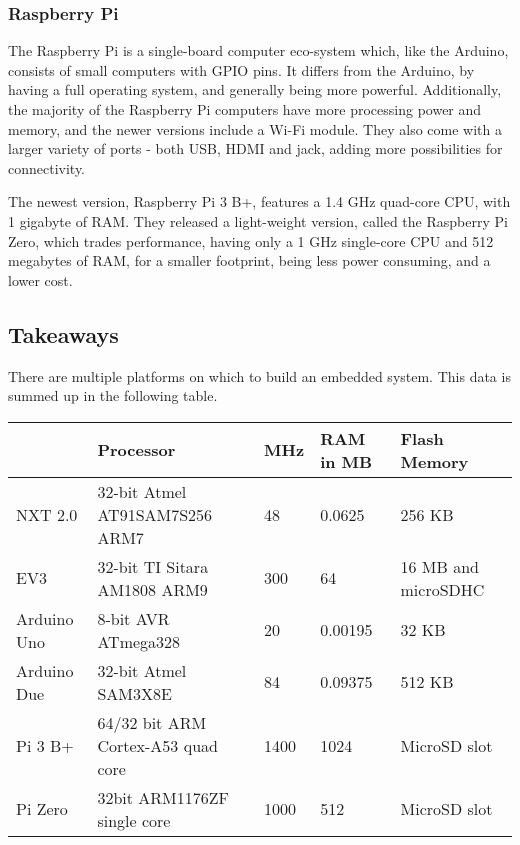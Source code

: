 \subsubsection{Raspberry Pi}
The Raspberry Pi is a single-board computer eco-system which, like the Arduino, consists of small computers with GPIO pins.
It differs from the Arduino, by having a full operating system, and generally being more powerful.
Additionally, the majority of the Raspberry Pi computers have more processing power and memory, and the newer versions include a Wi-Fi module.
They also come with a larger variety of ports - both USB, HDMI and jack, adding more possibilities for connectivity.


The newest version, Raspberry Pi 3 B+, features a 1.4 GHz quad-core CPU, with 1 gigabyte of RAM.
They released a light-weight version, called the Raspberry Pi Zero, which trades performance, having only a 1 GHz single-core CPU and 512 megabytes of RAM, for a smaller footprint, being less power consuming, and a lower cost.

\subsection{Takeaways}
There are multiple platforms on which to build an embedded system.
This data is summed up in the following table.

\begin{table}[h]
	\begin{adjustbox}{max width=\textwidth}
	\begin{tabular}{|l|l|l|l|l|}
		\hline
		                & Processor                          & MHz 	& RAM in MB    & Flash Memory          	\\\hline
		NXT 2.0 		& 32-bit Atmel AT91SAM7S256 ARM7     & 48  	& 0.0625   & 256 KB                   	\\
		EV3     		& 32-bit TI Sitara AM1808 ARM9       & 300 	& 64   & 16 MB and microSDHC 			\\
		Arduino Uno    	& 8-bit AVR ATmega328                & 20  	& 0.00195    & 32 KB                    \\
		Arduino Due    	& 32-bit Atmel SAM3X8E               & 84  	& 0.09375   & 512 KB                   	\\
		Pi 3 B+      	& 64/32 bit ARM Cortex-A53 quad core & 1400 & 1024    & MicroSD slot            	\\
		Pi Zero       	& 32bit ARM1176ZF single core        & 1000 & 512  & MicroSD slot 					\\\hline
	\end{tabular}
\end{adjustbox}
\end{table}

